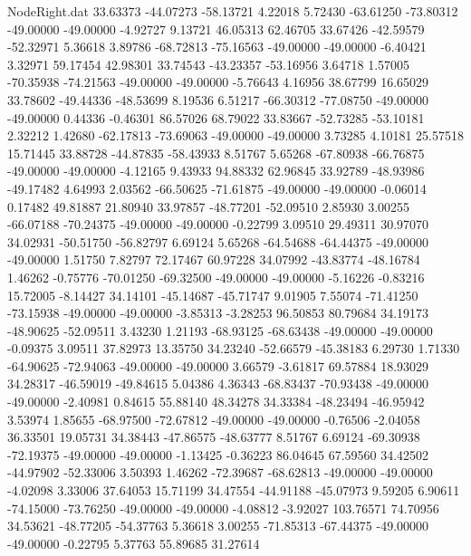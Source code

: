 \begin{filecontents}{NodeRight.dat}
  33.63373  -44.07273  -58.13721     4.22018    5.72430  -63.61250  -73.80312  -49.00000  -49.00000   -4.92727    9.13721   46.05313   62.46705
  33.67426  -42.59579  -52.32971     5.36618    3.89786  -68.72813  -75.16563  -49.00000  -49.00000   -6.40421    3.32971   59.17454   42.98301
  33.74543  -43.23357  -53.16956     3.64718    1.57005  -70.35938  -74.21563  -49.00000  -49.00000   -5.76643    4.16956   38.67799   16.65029
  33.78602  -49.44336  -48.53699     8.19536    6.51217  -66.30312  -77.08750  -49.00000  -49.00000    0.44336   -0.46301   86.57026   68.79022
  33.83667  -52.73285  -53.10181     2.32212    1.42680  -62.17813  -73.69063  -49.00000  -49.00000    3.73285    4.10181   25.57518   15.71445
  33.88728  -44.87835  -58.43933     8.51767    5.65268  -67.80938  -66.76875  -49.00000  -49.00000   -4.12165    9.43933   94.88332   62.96845
  33.92789  -48.93986  -49.17482     4.64993    2.03562  -66.50625  -71.61875  -49.00000  -49.00000   -0.06014    0.17482   49.81887   21.80940
  33.97857  -48.77201  -52.09510     2.85930    3.00255  -66.07188  -70.24375  -49.00000  -49.00000   -0.22799    3.09510   29.49311   30.97070
  34.02931  -50.51750  -56.82797     6.69124    5.65268  -64.54688  -64.44375  -49.00000  -49.00000    1.51750    7.82797   72.17467   60.97228
  34.07992  -43.83774  -48.16784     1.46262   -0.75776  -70.01250  -69.32500  -49.00000  -49.00000   -5.16226   -0.83216   15.72005   -8.14427
  34.14101  -45.14687  -45.71747     9.01905    7.55074  -71.41250  -73.15938  -49.00000  -49.00000   -3.85313   -3.28253   96.50853   80.79684
  34.19173  -48.90625  -52.09511     3.43230    1.21193  -68.93125  -68.63438  -49.00000  -49.00000   -0.09375    3.09511   37.82973   13.35750
  34.23240  -52.66579  -45.38183     6.29730    1.71330  -64.90625  -72.94063  -49.00000  -49.00000    3.66579   -3.61817   69.57884   18.93029
  34.28317  -46.59019  -49.84615     5.04386    4.36343  -68.83437  -70.93438  -49.00000  -49.00000   -2.40981    0.84615   55.88140   48.34278
  34.33384  -48.23494  -46.95942     3.53974    1.85655  -68.97500  -72.67812  -49.00000  -49.00000   -0.76506   -2.04058   36.33501   19.05731
  34.38443  -47.86575  -48.63777     8.51767    6.69124  -69.30938  -72.19375  -49.00000  -49.00000   -1.13425   -0.36223   86.04645   67.59560
  34.42502  -44.97902  -52.33006     3.50393    1.46262  -72.39687  -68.62813  -49.00000  -49.00000   -4.02098    3.33006   37.64053   15.71199
  34.47554  -44.91188  -45.07973     9.59205    6.90611  -74.15000  -73.76250  -49.00000  -49.00000   -4.08812   -3.92027  103.76571   74.70956
  34.53621  -48.77205  -54.37763     5.36618    3.00255  -71.85313  -67.44375  -49.00000  -49.00000   -0.22795    5.37763   55.89685   31.27614

\end{filecontents}
